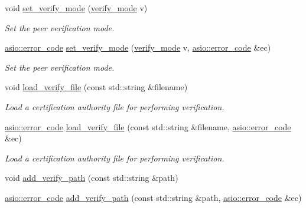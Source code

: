 \begin{DoxyCompactItemize}
void \hyperlink{classasio_1_1ssl_1_1old_1_1basic__context_a40a0d646fdba4f375136fe55dad4bd77}{set\+\_\+verify\+\_\+mode} (\hyperlink{classasio_1_1ssl_1_1context__base_aa9ef38ba747dd4e8ecb1f9a279a67d6b}{verify\+\_\+mode} v)
\begin{DoxyCompactList}\small\item\em Set the peer verification mode. \end{DoxyCompactList}\item 
\hyperlink{classasio_1_1error__code}{asio\+::error\+\_\+code} \hyperlink{classasio_1_1ssl_1_1old_1_1basic__context_a68197e690fa1135840dcf705007766e7}{set\+\_\+verify\+\_\+mode} (\hyperlink{classasio_1_1ssl_1_1context__base_aa9ef38ba747dd4e8ecb1f9a279a67d6b}{verify\+\_\+mode} v, \hyperlink{classasio_1_1error__code}{asio\+::error\+\_\+code} \&ec)
\begin{DoxyCompactList}\small\item\em Set the peer verification mode. \end{DoxyCompactList}\item 
void \hyperlink{classasio_1_1ssl_1_1old_1_1basic__context_a3b476dac460f54c332545d5b2d8ec9b8}{load\+\_\+verify\+\_\+file} (const std\+::string \&filename)
\begin{DoxyCompactList}\small\item\em Load a certification authority file for performing verification. \end{DoxyCompactList}\item 
\hyperlink{classasio_1_1error__code}{asio\+::error\+\_\+code} \hyperlink{classasio_1_1ssl_1_1old_1_1basic__context_accf7e4584fd31547a99b62c119eb1335}{load\+\_\+verify\+\_\+file} (const std\+::string \&filename, \hyperlink{classasio_1_1error__code}{asio\+::error\+\_\+code} \&ec)
\begin{DoxyCompactList}\small\item\em Load a certification authority file for performing verification. \end{DoxyCompactList}\item 
void \hyperlink{classasio_1_1ssl_1_1old_1_1basic__context_ac5e3fd95d188e164d348e6a2cc4a6d78}{add\+\_\+verify\+\_\+path} (const std\+::string \&path)
\item 
\hyperlink{classasio_1_1error__code}{asio\+::error\+\_\+code} \hyperlink{classasio_1_1ssl_1_1old_1_1basic__context_a5a6166781d31668abdefd088a2c4e31e}{add\+\_\+verify\+\_\+path} (const std\+::string \&path, \hyperlink{classasio_1_1error__code}{asio\+::error\+\_\+code} \&ec)
\item 

\end{DoxyCompactItemize}

